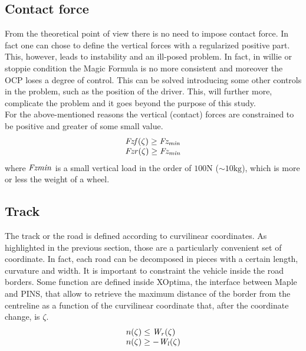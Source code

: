 \subsection{Contact force}
%
From the theoretical point of view there is no need to impose contact force. In fact one can chose to define the vertical forces with a regularized positive part. This, however, leads to instability and an ill-posed problem. In fact, in willie or stoppie condition the Magic Formula is no more consistent and moreover the OCP loses a degree of control. This can be solved introducing some other controls in the problem, such as the position of the driver. This, will further more, complicate the problem and it goes beyond the purpose of this study.\\
For the above-mentioned reasons the vertical (contact) forces are constrained to be positive and greater of some small value.
%
\begin{equation}
    \begin{array}{l}
        {\it Fzf}(\zeta) \ge {\it Fz_{min}}\\
        {\it Fzr}(\zeta) \ge {\it Fz_{min}}\\
    \end{array}
\end{equation}
%
where ${\it Fzmin}$ is a small vertical load in the order of $100 \si{\newton}$ ($\sim 10 \si{\kilogram}$), which is more or less the weight of a wheel.



\subsection{Track}
%
The track or the road is defined according to curvilinear coordinates. As highlighted in the previous section, those are a particularly convenient set of coordinate. In fact, each road can be decomposed in pieces with a certain length, curvature and width. It is important to constraint the vehicle inside the road borders. Some function are defined inside XOptima, the interface between Maple and PINS, that allow to retrieve the maximum distance of the border from the centreline as a function of the curvilinear coordinate that, after the coordinate change, is $\zeta$.
%
\begin{equation}
    \begin{array}{l}
        n(\zeta) \le  {\it W_r}(\zeta)\\
        n(\zeta) \ge -{\it W_l}(\zeta)
    \end{array}
\end{equation}
%